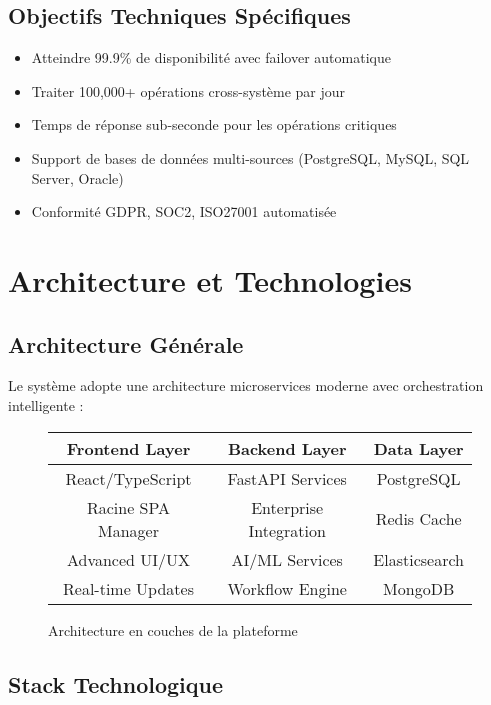 \documentclass[a4paper,12pt]{article}
\begin{document}
\subsection*{Objectifs Techniques Spécifiques}

\begin{itemize}
    \item Atteindre 99.9\% de disponibilité avec failover automatique
    \item Traiter 100,000+ opérations cross-système par jour
    \item Temps de réponse sub-seconde pour les opérations critiques
    \item Support de bases de données multi-sources (PostgreSQL, MySQL, SQL Server, Oracle)
    \item Conformité GDPR, SOC2, ISO27001 automatisée
\end{itemize}

\section*{Architecture et Technologies}

\subsection*{Architecture Générale}

Le système adopte une architecture microservices moderne avec orchestration intelligente :

\begin{figure}[h]
\centering
\begin{tabular}{|c|c|c|}
\hline
\textbf{Frontend Layer} & \textbf{Backend Layer} & \textbf{Data Layer} \\
\hline
React/TypeScript & FastAPI Services & PostgreSQL \\
Racine SPA Manager & Enterprise Integration & Redis Cache \\
Advanced UI/UX & AI/ML Services & Elasticsearch \\
Real-time Updates & Workflow Engine & MongoDB \\
\hline
\end{tabular}
\caption{Architecture en couches de la plateforme}
\end{figure}

\subsection*{Stack Technologique}
\end{document}
